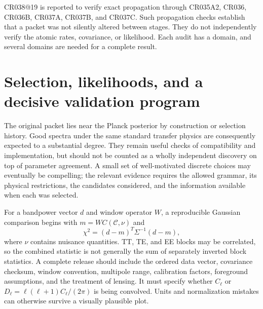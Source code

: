 CR038@19 is reported to verify exact propagation through CR035A2, CR036, CR036B, CR037A, CR037B, and CR037C. Such propagation checks establish that a packet was not silently altered between stages. They do not independently verify the atomic rates, covariance, or likelihood. Each audit has a domain, and several domains are needed for a complete result.

\section{Selection, likelihoods, and a decisive validation program}

The original packet lies near the Planck posterior by construction or selection history. Good spectra under the same standard transfer physics are consequently expected to a substantial degree. They remain useful checks of compatibility and implementation, but should not be counted as a wholly independent discovery on top of parameter agreement. A small set of well-motivated discrete choices may eventually be compelling; the relevant evidence requires the allowed grammar, its physical restrictions, the candidates considered, and the information available when each was selected.

For a bandpower vector $d$ and window operator $W$, a reproducible Gaussian comparison begins with $m=W C(\mathcal C,\nu)$ and
\begin{equation}
 \chi^2=(d-m)^T\Sigma^{-1}(d-m),
 \label{c9:bandpower}
\end{equation}
where $\nu$ contains nuisance quantities. TT, TE, and EE blocks may be correlated, so the combined statistic is not generally the sum of separately inverted block statistics. A complete release should include the ordered data vector, covariance checksum, window convention, multipole range, calibration factors, foreground assumptions, and the treatment of lensing. It must specify whether $C_\ell$ or $D_\ell=\ell(\ell+1)C_\ell/(2\pi)$ is being convolved. Units and normalization mistakes can otherwise survive a visually plausible plot.


